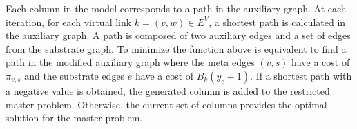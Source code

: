 \documentclass[article]{llncs}
\begin{document}
Each column in the model corresponds to a path in the auxiliary graph. At each iteration, for each virtual link $k = (v,w) \in E^V$, a shortest path is calculated in the auxiliary graph. A path is composed of two auxiliary edges and a set of edges from the substrate graph. To minimize the function above is equivalent to find a path in the modified auxiliary graph where the meta edges $(v,s)$ have a cost of $\pi_{v,s}$ and the substrate edges $e$ have a cost of $B_{k}(y_{e} + 1)$. If a shortest path with a negative value is obtained, the generated column is added to the restricted master problem. Otherwise, the current set of columns provides the optimal solution for the master problem.

\end{document}
